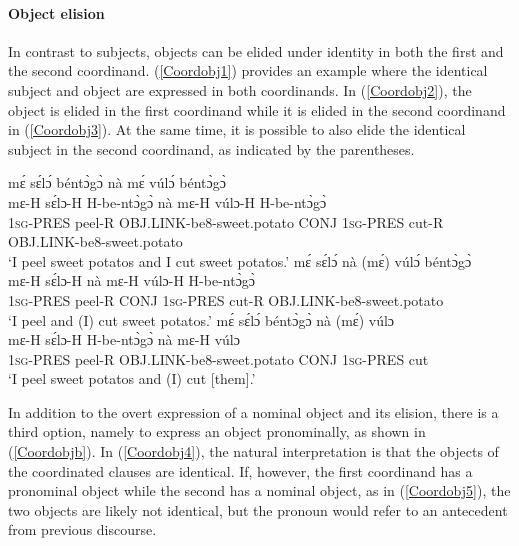 \paragraph{Object elision} In contrast to subjects, objects can be elided under identity in both the first and the second coordinand. (\ref{Coordobj1}) provides an example where the identical subject and object are expressed in both coordinands. In (\ref{Coordobj2}), the object is elided in the first coordinand while it is elided in the second coordinand in (\ref{Coordobj3}). At the same time, it is possible to also elide the identical subject in the second coordinand, as indicated by the parentheses.

\begin{exe} 
\ex\label{Coordobj} 
\begin{xlist}
\ex\label{Coordobj1}
\glll mɛ́ sɛ́lɔ́ béntɔ̀gɔ̀ nà mɛ́ vúlɔ́ béntɔ̀gɔ̀  \\
 mɛ-H sɛ́lɔ-H H-be-ntɔ̀gɔ̀ nà mɛ-H vúlɔ-H H-be-ntɔ̀gɔ̀ \\
1\textsc{sg}-PRES peel-R OBJ.LINK-be8-sweet.potato CONJ 1\textsc{sg}-PRES cut-R OBJ.LINK-be8-sweet.potato \\
\trans `I peel sweet potatos and I cut sweet potatos.'
\ex\label{Coordobj2}
\glll mɛ́ sɛ́lɔ́ nà (mɛ́) vúlɔ́ béntɔ̀gɔ̀ \\
 mɛ-H sɛ́lɔ-H nà mɛ-H vúlɔ-H H-be-ntɔ̀gɔ̀ \\
1\textsc{sg}-PRES peel-R CONJ 1\textsc{sg}-PRES cut-R OBJ.LINK-be8-sweet.potato \\
\trans `I peel and (I) cut sweet potatos.'
\ex\label{Coordobj3}
\glll mɛ́ sɛ́lɔ́ béntɔ̀gɔ̀ nà (mɛ́) vúlɔ \\
 mɛ-H sɛ́lɔ-H H-be-ntɔ̀gɔ̀ nà mɛ-H vúlɔ\\
1\textsc{sg}-PRES peel-R OBJ.LINK-be8-sweet.potato CONJ 1\textsc{sg}-PRES cut \\
\trans `I peel sweet potatos and (I) cut [them].'
\end{xlist}
\end{exe}

In addition to the overt expression of a nominal object and its elision, there is a third option, namely to express an object pronominally, as shown in (\ref{Coordobjb}). In (\ref{Coordobj4}), the natural interpretation is that the objects of the coordinated clauses are identical. If, however, the first coordinand has a pronominal object while the second has a nominal object, as in (\ref{Coordobj5}), the two objects are likely not identical, but the pronoun would refer to an antecedent from previous discourse.


